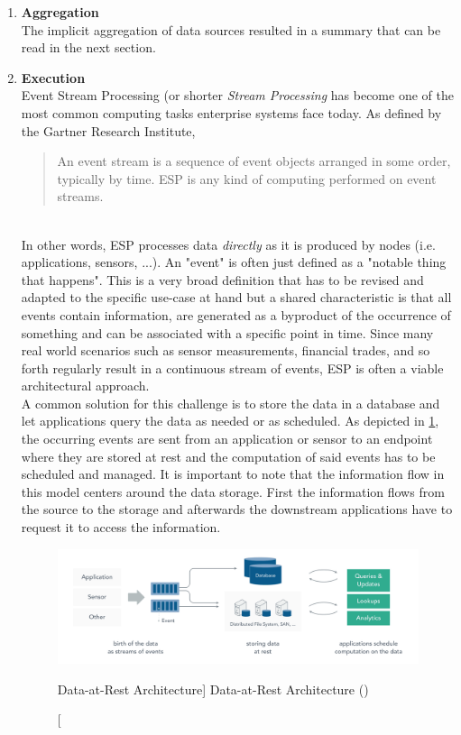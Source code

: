 \begin{enumerate}
    \item
    \textbf{Aggregation}\\
    The implicit aggregation of data sources resulted in a summary that can be read in the next section.
    
    \item
    \textbf{Execution}\\
    Event Stream Processing (or shorter \textit{Stream Processing} has become one of the most common computing tasks enterprise systems face today. As defined by the Gartner Research Institute,
    \blockquote{An event stream is a sequence of event objects arranged in some order, typically by time. \acf{ESP} is any kind of computing performed on event streams.}\autocite{Schulte2017TechnologyProcessing}\\
    In other words, \acf{ESP} processes data \textit{directly} as it is produced by nodes (i.e. applications, sensors, ...). An "event" is often just defined as a "notable thing that happens".\autocite{Group2006Event-DrivenOverview} This is a very broad definition that has to be revised and adapted to the specific use-case at hand but a shared characteristic is that all events contain information, are generated as a byproduct of the occurrence of something and can be associated with a specific point in time. 
    Since many real world scenarios such as sensor measurements, financial trades, and so forth regularly result in a continuous stream of events, \acf{ESP} is often a viable architectural approach.\\
    A common solution for this challenge is to store the data in a database and let applications query the data as needed or as scheduled. As depicted in \ref{fig:dataRest}, the occurring events are sent from an application or sensor to an endpoint where they are stored at rest and the computation of said events has to be scheduled and managed. It is important to note that the information flow in this model centers around the data storage. First the information flows from the source to the storage and afterwards the downstream applications have to request it to access the information.
    
    \begin{figure}[ht]
        \includegraphics[width=\linewidth]{images/streaming/data_at_rest.png}\centering
        \caption
        [Data-at-Rest Architecture]
        {Data-at-Rest Architecture (\cite{dataArtisans2017WhatProcessing})}
        \label{fig:dataRest}
    \end{figure}
    

\end{enumerate}
